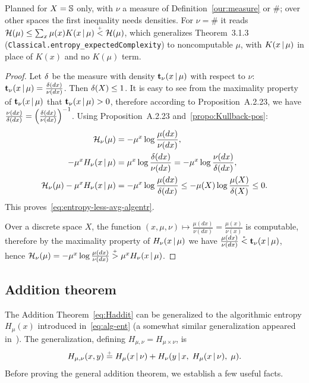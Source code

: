 \begin{formalization}
Planned for $X = \mathbb{S}$ only, with $\nu$ a measure of Definition~\ref{our:measure} or $\#$; over
other spaces the first inequality needs densities. For $\nu = \#$ it reads
$\mathcal{H}(\mu)\le\sum_{x}\mu(x)K(x \,\vert\, \mu)\stackrel{{}_+}{<}\mathcal{H}(\mu)$, which generalizes Theorem~3.1.3
(\texttt{Classical.entropy\_expectedComplexity}) to noncomputable $\mu$, with
$K(x \,\vert\, \mu)$ in place of $K(x)$ and no $K(\mu)$ term.
\end{formalization}
 \begin{proof}
Let
$\delta$ be the measure with density $\mathbf{t}_{\nu}(x \,\vert\, \mu)$ with respect to
$\nu$: $\mathbf{t}_{\nu}(x \,\vert\, \mu) = \frac{\delta(dx)}{\nu(dx)}$.
Then $\delta(X) \le 1$.
It is easy to see from the maximality property of $\mathbf{t}_{\nu}(x \,\vert\, \mu)$
that $\mathbf{t}_{\nu}(x \,\vert\, \mu) > 0$, therefore according to
Proposition~A.2.23, we have
$\frac{\nu(dx)}{\delta(dx)} = {\left( \frac{\delta(dx)}{\nu(dx)}\right)}^{-1}$.
Using Proposition~A.2.23 and~\ref{propo:Kullback-pos}: 
 \begin{align*}
     \mathcal{H}_{\nu}(\mu)     &= - \mu^{x} \log\frac{\mu(dx)}{\nu(dx)},
\\   - \mu^{x} H_{\nu}(x \,\vert\, \mu) &=  \mu^{x} \log \frac{\delta(dx)}{\nu(dx)}
              = - \mu^{x} \log \frac{\nu(dx)}{\delta(dx)},
\\    \mathcal{H}_{\nu}(\mu) - \mu^{x} H_{\nu}(x \,\vert\, \mu)
     &= - \mu^{x} \log \frac{\mu(dx)}{\delta(dx)} 
  \le -\mu(X) \log\frac{\mu(X)}{\delta(X)} \le 0.
 \end{align*}
This proves~\eqref{eq:entropy-less-avg-algentr}.

Over a discrete space $X$, the function
$(x,\mu,\nu) \mapsto \frac{\mu(dx)}{\nu(dx)} = \frac{\mu(x)}{\nu(x)}$
is computable, therefore by the maximality property of
$H_{\nu}(x \,\vert\, \mu)$ we have 
$\frac{\mu(dx)}{\nu(dx)} \stackrel{{}_*}{<} \mathbf{t}_{\nu}(x \,\vert\, \mu)$,
hence $\mathcal{H}_{\nu}(\mu) = -\mu^{x} \log \frac{\mu(dx)}{\nu(dx)} 
 \stackrel{{}_+}{>} \mu^{x} H_{\nu}(x \,\vert\, \mu)$.
 \end{proof} 


\subsection{Addition theorem}
The Addition Theorem~\eqref{eq:Haddit}
can be generalized to the algorithmic entropy $H_{\mu}(x)$
introduced in~\eqref{eq:alg-ent} (a somewhat similar generalization appeared
in~\cite{VovkVyugin93}).
The generalization, defining $H_{\mu,\nu} = H_{\mu\times\nu}$, is
 \begin{equation}\label{eq:addition-general}
   H_{\mu,\nu}(x,y)\stackrel{{}_+}{=}
  H_\mu(x \,\vert\, \nu)+ H_\nu(y \,\vert\, x,\; H_\mu(x \,\vert\, \nu),\; \mu).
 \end{equation}
Before proving the general addition theorem, we establish a few useful
facts.

